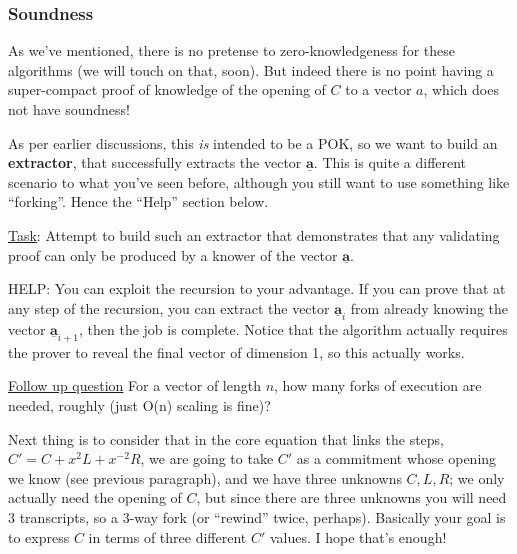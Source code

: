 \documentclass[10pt,a4paper]{article}
\begin{document}
\subsubsection{Soundness}

As we've mentioned, there is no pretense to zero-knowledgeness for these algorithms (we will touch on that, soon). But indeed there is no point having a super-compact proof of knowledge of the opening of $C$ to a vector $a$, which does not have soundness!

\vspace{5 pt}

As per earlier discussions, this \emph{is} intended to be a POK, so we want to build an \textbf{extractor}, that successfully extracts the vector $\underline{\textbf{a}}$. This is quite a different scenario to what you've seen before, although you still want to use something like ``forking''. Hence the ``Help'' section below.

\vspace{5 pt}

\begin{framed}
\underline{Task}: Attempt to build such an extractor that demonstrates that any validating proof can only be produced by a knower of the vector $\underline{\textbf{a}}$.
\end{framed}

\begin{framed}
HELP: You can exploit the recursion to your advantage. If you can prove that at any step of the recursion, you can extract the vector $\underline{\textbf{a}}_i$ from already knowing the vector $\underline{\textbf{a}}_{i+1}$, then the job is complete. Notice that the algorithm actually requires the prover to reveal the final vector of dimension 1, so this actually works.

\vspace{5 pt}

\underline{Follow up question} For a vector of length $n$, how many forks of execution are needed, roughly (just O(n) scaling is fine)?

\vspace{5 pt}

Next thing is to consider that in the core equation that links the steps, $C' = C + x^{2}L + x^{-2}R$, we are going to take $C'$ as a commitment whose opening we know (see previous paragraph), and we have three unknowns $C, L, R$; we only actually need the opening of $C$, but since there are three unknowns you will need 3 transcripts, so a 3-way fork (or ``rewind'' twice, perhaps). Basically your goal is to express $C$ in terms of three different $C'$ values. I hope that's enough!
\end{framed}
\end{document}
